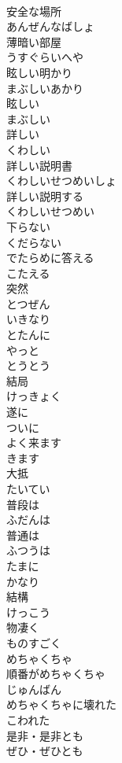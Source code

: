 \documentclass[8pt]{extreport}
\begin{document}
\begin{CJK}{UTF8}{min}
\\	安全な場所	
\\	あんぜんなばしょ
\\	薄暗い部屋	
\\	うすぐらいへや
\\	眩しい明かり	
\\	まぶしいあかり
\\	眩しい	
\\	まぶしい
\\	詳しい	
\\	くわしい
\\	詳しい説明書	
\\	くわしいせつめいしょ
\\	詳しい説明する	
\\	くわしいせつめい
\\	下らない	
\\	くだらない
\\	でたらめに答える	
\\	こたえる
\\	突然	
\\	とつぜん
\\	いきなり	
\\	とたんに	
\\	やっと	
\\	とうとう	
\\	結局	
\\	けっきょく
\\	遂に	
\\	ついに
\\	よく来ます	
\\	きます
\\	大抵	
\\	たいてい
\\	普段は	
\\	ふだんは
\\	普通は	
\\	ふつうは
\\	たまに	
\\	かなり	
\\	結構	
\\	けっこう
\\	物凄く	
\\	ものすごく
\\	めちゃくちゃ	
\\	順番がめちゃくちゃ	
\\	じゅんばん
\\	めちゃくちゃに壊れた	
\\	こわれた
\\	是非・是非とも	
\\	ぜひ・ぜひとも

\end{CJK}
\end{document}
